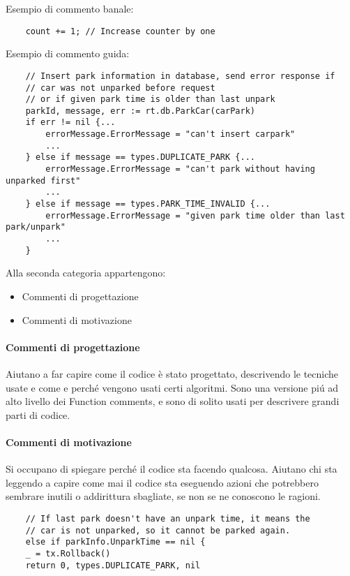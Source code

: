 \documentclass[italian, oneside]{sapthesis} %
\begin{document}
		Esempio di commento banale:
		\begin{lstlisting}
	count += 1; // Increase counter by one
		\end{lstlisting}

		\pagebreak
		Esempio di commento guida:
		\begin{lstlisting}
	// Insert park information in database, send error response if
	// car was not unparked before request
	// or if given park time is older than last unpark
	parkId, message, err := rt.db.ParkCar(carPark)
	if err != nil {...
		errorMessage.ErrorMessage = "can't insert carpark"
		...
	} else if message == types.DUPLICATE_PARK {...
		errorMessage.ErrorMessage = "can't park without having unparked first"
		...
	} else if message == types.PARK_TIME_INVALID {...
		errorMessage.ErrorMessage = "given park time older than last park/unpark"
		...
	}
		\end{lstlisting}

		Alla seconda categoria appartengono: 
		\begin{itemize}
			\item Commenti di progettazione
			\item Commenti di motivazione
		\end{itemize}

		\paragraph*{Commenti di progettazione} Aiutano a far capire come il codice \`e stato progettato, descrivendo le tecniche usate e come e perch\'e vengono usati certi algoritmi. Sono una versione pi\'u ad alto livello dei Function comments, e sono di solito usati per descrivere grandi parti di codice.

		\paragraph*{Commenti di motivazione} Si occupano di spiegare perch\'e il codice sta facendo qualcosa. Aiutano chi sta leggendo a capire come mai il codice sta eseguendo azioni che potrebbero sembrare inutili o addirittura sbagliate, se non se ne conoscono le ragioni.
		\begin{lstlisting}
	// If last park doesn't have an unpark time, it means the 
	// car is not unparked, so it cannot be parked again.
	else if parkInfo.UnparkTime == nil {
	_ = tx.Rollback()
	return 0, types.DUPLICATE_PARK, nil
		\end{lstlisting}
	
\end{document}
